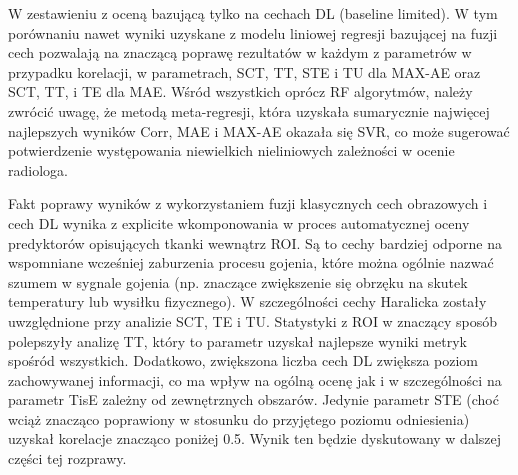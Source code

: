 \begin{table}[h]
\begin{center}
\begin{tabular}{lc||c|c|c|c|c|c}
		\end{tabular}
	\end{center}
	\label{tab:testset}
\end{table}

W zestawieniu z oceną bazującą tylko na cechach DL (baseline limited). W tym porównaniu nawet wyniki uzyskane z modelu liniowej regresji bazującej na fuzji cech pozwalają na znaczącą poprawę rezultatów w każdym z parametrów w przypadku korelacji, w parametrach, SCT, TT, STE i TU dla MAX-AE oraz SCT, TT, i TE dla MAE. Wśród wszystkich oprócz RF algorytmów, należy zwrócić uwagę, że metodą meta-regresji, która uzyskała sumarycznie najwięcej najlepszych wyników Corr, MAE i MAX-AE okazała się SVR, co może sugerować potwierdzenie występowania niewielkich nieliniowych zależności w ocenie radiologa. 

Fakt poprawy wyników z wykorzystaniem fuzji klasycznych cech obrazowych i cech DL wynika z explicite wkomponowania w proces automatycznej oceny predyktorów opisujących tkanki wewnątrz ROI. Są to cechy bardziej odporne na wspomniane wcześniej zaburzenia procesu gojenia, które można ogólnie nazwać szumem w sygnale gojenia (np. znaczące zwiększenie się obrzęku na skutek temperatury lub wysiłku fizycznego). W szczególności cechy Haralicka zostały uwzględnione przy analizie SCT, TE i TU. Statystyki z ROI w znaczący sposób polepszyły analizę TT, który to parametr uzyskał najlepsze wyniki metryk spośród wszystkich. Dodatkowo, zwiększona liczba cech DL zwiększa poziom zachowywanej informacji, co ma wpływ na ogólną ocenę jak i w szczególności na parametr TisE zależny od zewnętrznych obszarów. Jedynie parametr STE (choć wciąż znacząco poprawiony w stosunku do przyjętego poziomu odniesienia) uzyskał korelacje znacząco poniżej 0.5. Wynik ten będzie dyskutowany w dalszej części tej rozprawy.

